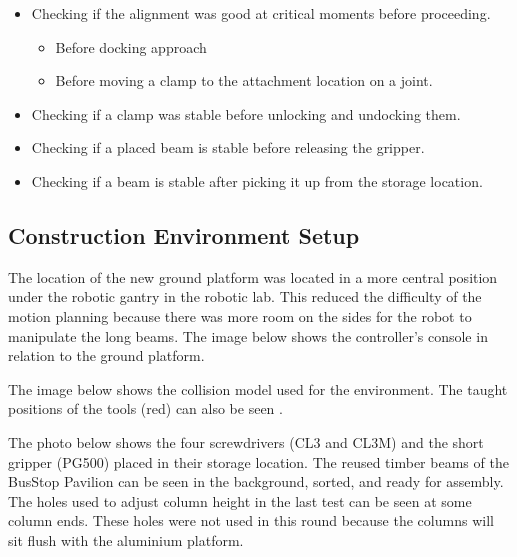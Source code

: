 \begin{itemize}
	\item Checking if the alignment was good at critical moments before proceeding.

\begin{itemize}
	\item Before docking approach

	\item Before moving a clamp to the attachment location on a joint.

\end{itemize}
	\item Checking if a clamp was stable before unlocking and undocking them.

	\item Checking if a placed beam is stable before releasing the gripper.

	\item Checking if a beam is stable after picking it up from the storage location.

\end{itemize}

\subsection{Construction Environment Setup}
\label{subsection:exploration-3-construction-environment-setup}

The location of the new ground platform   was located in a more central position under the robotic gantry in the robotic lab. This reduced the difficulty of the motion planning because there was more room on the sides for the robot to manipulate the long beams. The image below shows the controller’s console in relation to the ground platform.




The image below shows the collision model used for the environment. The taught positions of the tools (red) can also be seen .




The photo below shows the four screwdrivers (CL3 and CL3M) and the short gripper (PG500) placed in their storage location. The reused timber beams of the BusStop Pavilion can be seen in the background, sorted, and ready for assembly. The holes used to adjust column height in the last test can be seen at some column ends. These holes were not used in this round because the columns will sit flush with the aluminium platform.

